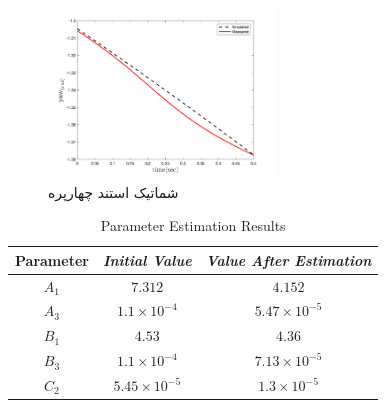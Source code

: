 \documentclass{CCI2020}
\begin{document}
\begin{figure}[h]
	\includegraphics[width=6cm]{../Figures/RCP/yaw_parameter_estimation/RCP_yaw_S2.png}
	\centering
	\caption{شماتیک استند چهارپره}
	\label{QuadAssum}
\end{figure}

\begin{table}[!h]
	\renewcommand{\arraystretch}{1.3}
	\caption{Parameter Estimation Results}
	\begin{center}
		\begin{tabular}{c c c}
			\hline
			\textbf{Parameter} & \textbf{\textit{Initial Value}}& \textbf{\textit{Value After Estimation}} \\
			\hline
			$A_1$ & $7.312$ & $4.152$ \\
			$A_3$  & $1.1\times10^{-4}$ & $5.47\times10^{-5}$\\
			$B_1$  & $4.53$ & $4.36$ \\
			$B_3$  & $1.1\times10^{-4}$ & $7.13\times10^{-5}$ \\ 
			$C_2$  & $5.45\times10^{-5}$ & $1.3\times10^{-5}$ \\
			\hline
		\end{tabular}
		\label{tab1}
	\end{center}
\end{table}
\end{document}

